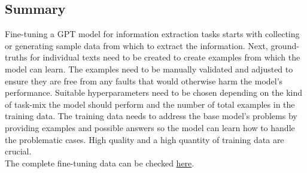 \subsection*{Summary}
Fine-tuning a GPT model for information extraction tasks starts with collecting or generating sample data from which to extract the information. Next, ground-truths for individual texts need to be created to create examples from which the model can learn. The examples need to be manually validated and adjusted to ensure they are free from any faults that would otherwise harm the model's performance. Suitable hyperparameters need to be chosen depending on the kind of task-mix the model should perform and the number of total examples in the training data. The training data needs to address the base model's problems by providing examples and possible answers so the model can learn how to handle the problematic cases. High quality and a high quantity of training data are crucial.\\
The complete fine-tuning data can be checked \href{https://github.com/FR-SON/Bachelor-Thesis}{here}.